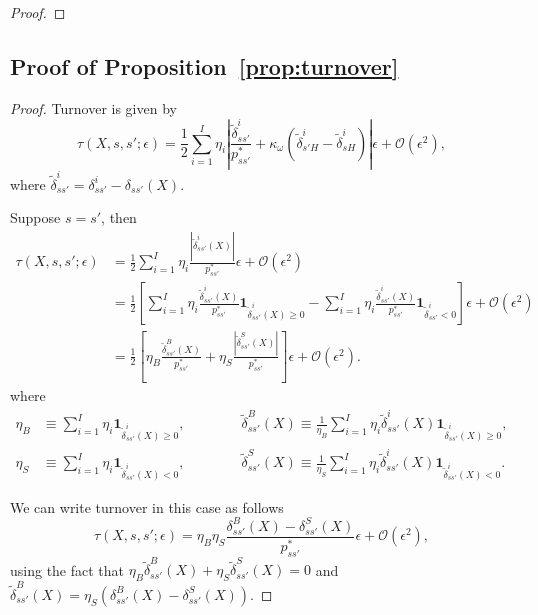 \begin{proof}
\end{proof}

\subsection{Proof of Proposition~\ref{prop:turnover}}\label{app: proof_prop_turnover}

\begin{proof}
    Turnover is given by
\begin{equation}
    \tau(X,s,s';\epsilon) = \frac{1}{2} \sum_{i=1}^I \eta_i\left\lvert  \frac{\tilde{\delta}_{s s'}^i}{p_{ss'}^*} +\kappa_\omega\left(\tilde{\delta}_{s'H}^i - \tilde{\delta}_{sH}^i  \right)\right\rvert \epsilon + \mathcal{O}(\epsilon^2),
\end{equation}
where $\tilde{\delta}_{ss'}^i = \delta_{ss'}^i - \delta_{ss'}(X)$.

Suppose $s = s'$, then
\begin{align}
    \tau(X,s,s';\epsilon) &= \frac{1}{2} \sum_{i=1}^I \eta_i  \frac{\left\lvert \tilde{\delta}_{s s'}^i(X)\right\rvert}{p_{ss'}^*} \epsilon + \mathcal{O}(\epsilon^2)\\
    &= \frac{1}{2} \left[\sum_{i=1}^I \eta_i \frac{\tilde{\delta}_{ss'}^i(X)}{p_{ss'}^*}\textbf{1}_{\tilde{\delta}_{ss'}^i(X)\geq 0} -  \sum_{i=1}^I \eta_i \frac{ \tilde{\delta}_{ss'}^i(X)}{p_{ss'}^*}\textbf{1}_{\tilde{\delta}_{ss'}^i < 0} \right] \epsilon + \mathcal{O}(\epsilon^2)\\
    &= \frac{1}{2} \left[\eta_B \frac{\tilde{\delta}_{ss'}^B(X)}{p_{ss'}^*} +  \eta_S \frac{ |\tilde{\delta}_{ss'}^S(X)|}{p_{ss'}^*} \right] \epsilon + \mathcal{O}(\epsilon^2).
\end{align}
where 
\begin{align}
    \eta_B &\equiv \sum_{i=1}^I \eta_i \textbf{1}_{\tilde{\delta}_{ss'}^i(X) \geq 0}, \qquad \qquad  \tilde{\delta}_{ss'}^B(X) \equiv \frac{1}{\eta_B} \sum_{i=1}^I \eta_i \tilde{\delta}_{ss'}^i(X) \textbf{1}_{\tilde{\delta}_{ss'}^i(X) \geq 0}, \\
    \eta_S &\equiv \sum_{i=1}^I \eta_i \textbf{1}_{\tilde{\delta}_{ss'}^i(X) < 0}, \qquad \qquad  \tilde{\delta}_{ss'}^S(X) \equiv \frac{1}{\eta_S} \sum_{i=1}^I \eta_i \tilde{\delta}_{ss'}^i(X) \textbf{1}_{\tilde{\delta}_{ss'}^i(X) < 0}.
\end{align}

We can write turnover in this case as follows 
\begin{equation}
    \tau(X,s,s';\epsilon) = \eta_B \eta_S \frac{\delta_{ss'}^B(X) -\delta_{ss'}^S(X)}{p^*_{ss'}}\epsilon + \mathcal{O}(\epsilon^2),
\end{equation}
using the fact that $\eta_B \tilde{\delta}_{ss'}^B(X) + \eta_S \tilde{\delta}_{ss'}^S(X) = 0$ and $\tilde{\delta}_{ss'}^B(X) = \eta_S (\delta_{ss'}^B(X) - \delta_{ss'}^S(X))$.    


\end{proof}
